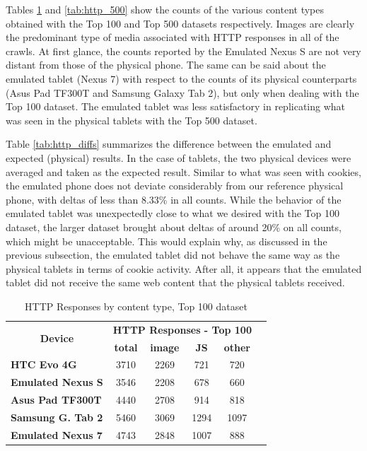 \documentclass{acm_proc_article-sp}
\begin{document}
Tables \ref{tab:http_100} and \ref{tab:http_500} show the counts of the various content types obtained with the Top 100 and Top 500 datasets respectively. Images are clearly the predominant type of media associated with HTTP responses in all of the crawls. At first glance, the counts reported by the Emulated Nexus S are not very distant from those of the physical phone. The same can be said about the emulated tablet (Nexus 7) with respect to the counts of its physical counterparts (Asus Pad TF300T and Samsung Galaxy Tab 2), but only when dealing with the Top 100 dataset. The emulated tablet was less satisfactory in replicating what was seen in the physical tablets with the Top 500 dataset.

Table \ref{tab:http_diffs} summarizes the difference between the emulated and expected (physical) results. In the case of tablets, the two physical devices were averaged and taken as the expected result. Similar to what was seen with cookies, the emulated phone does not deviate considerably from our reference physical phone, with deltas of less than 8.33\% in all counts. While the behavior of the emulated tablet was unexpectedly close to what we desired with the Top 100 dataset, the larger dataset brought about deltas of around 20\% on all counts, which might be unacceptable. This would explain why, as discussed in the previous subsection, the emulated tablet did not behave the same way as the physical tablets in terms of cookie activity. After all, it appears that the emulated tablet did not receive the same web content that the physical tablets received.

\begin{table}[h]
  \centering
  \caption{HTTP Responses by content type, Top 100 dataset}
    \begin{tabular}{|c|c|c|c|c|c|}
    \hline
    \multicolumn{1}{|c|}{\multirow{2}[4]{*}{\textbf{Device}}} & \multicolumn{4}{|c|}{\textbf{HTTP Responses - Top 100}} \\ \cline{2-5}
    \multicolumn{1}{|c|}{} & \textbf{total} & \textbf{image} & \textbf{JS} & \textbf{other} \\ \hline
    \multicolumn{1}{|l|}{\textbf{HTC Evo 4G}} & 3710  & 2269  & 721   & 720 \\
    \multicolumn{1}{|l|}{\textbf{Emulated Nexus S}} & 3546  & 2208  & 678   & 660 \\
    \multicolumn{1}{|l|}{\textbf{Asus Pad TF300T}} & 4440  & 2708  & 914   & 818 \\
    \multicolumn{1}{|l|}{\textbf{Samsung G. Tab 2}} & 5460  & 3069  & 1294  & 1097 \\
    \multicolumn{1}{|l|}{\textbf{Emulated Nexus 7}} & 4743  & 2848  & 1007  & 888 \\ \hline
    \end{tabular}%
  \label{tab:http_100}%
\end{table}%
\end{document}
